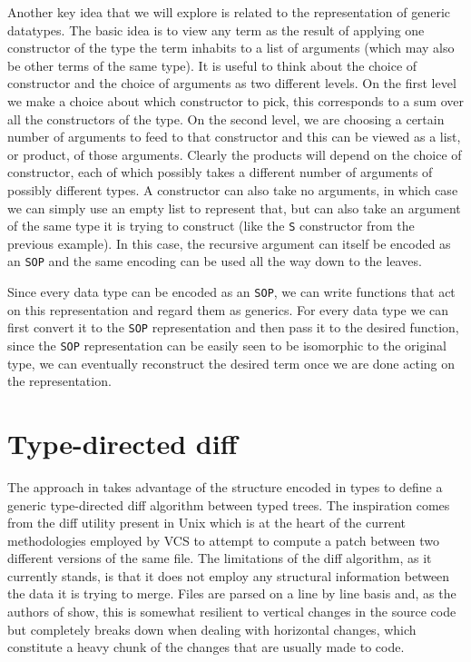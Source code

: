 \documentclass[11pt]{article}
\begin{document}
Another key idea that we will explore is related to the representation of 
generic datatypes. The basic idea is to view any term as the result of applying 
one constructor of the type the term inhabits to a list of arguments (which may also be other terms of the
same type). It is useful to think about the choice of constructor and the choice 
of arguments as two different levels. On the first level we 
make a choice about which constructor to pick, this corresponds to a sum
over all the constructors of the type. On the second level, we are choosing a certain number of arguments 
to feed to that constructor and this can be viewed as a list, or product, of 
those arguments. Clearly the products will depend on the choice of constructor, 
each of which possibly takes a different number of arguments of possibly 
different types. A constructor can also take no arguments, in which case we 
can simply use an empty list to represent that, but can also take an argument of 
the same type it is trying to construct (like the \texttt{S} constructor from the previous example). 
In this case, the recursive argument can itself be encoded as an \texttt{SOP} 
and the same encoding can be used all the way down to the leaves.

Since every data type can be encoded as an \texttt{SOP}, we can write functions 
that act on this representation and regard them as generics. For every data type 
we can first convert it to the \texttt{SOP} representation and then pass it to 
the desired function, since the \texttt{SOP} representation can be easily 
seen to be isomorphic to the original type, we can eventually reconstruct the 
desired term once we are done acting on the representation.

\section{Type-directed diff}\label{type-directed-diff}

The approach in \cite{type-directed diff} takes advantage of the structure 
encoded in types to define a generic type-directed diff algorithm between
typed trees. The inspiration comes from the diff utility present in
Unix which is at the heart of the current methodologies employed by VCS
to attempt to compute a patch between two different versions of the same
file. The limitations of the diff algorithm, as it currently stands, is
that it does not employ any structural information between the data it
is trying to merge. Files are parsed on a line by line basis and, as
the authors of \cite{type-directed diff} show, this is somewhat resilient to vertical changes in the
source code but completely breaks down when dealing with horizontal
changes, which constitute a heavy chunk of the changes that are usually
made to code.
\end{document}
